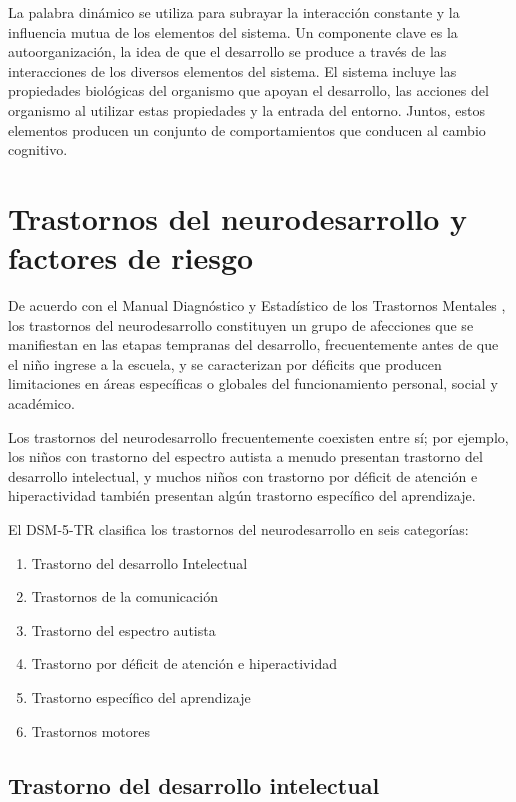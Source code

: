 \documentclass[11pt,letterpaper]{report}
\begin{document}
La palabra dinámico se utiliza para subrayar la interacción constante y la
influencia mutua de los elementos del sistema. Un componente clave es la
autoorganización, la idea de que el desarrollo se produce a través de las
interacciones de los diversos elementos del sistema. El sistema incluye las
propiedades biológicas del organismo que apoyan el desarrollo, las acciones del
organismo al utilizar estas propiedades y la entrada del entorno. Juntos,
estos elementos producen un conjunto de comportamientos que conducen al cambio
cognitivo. \cite{Gauvain2022}

\section{Trastornos del neurodesarrollo y factores de riesgo}
De acuerdo con el Manual Diagnóstico y Estadístico de los Trastornos Mentales
\cite{DSM5TR}, los trastornos del neurodesarrollo constituyen un grupo de 
afecciones que se manifiestan en las etapas tempranas del desarrollo, 
frecuentemente antes de que el niño ingrese a la escuela, y se caracterizan 
por déficits que producen limitaciones en áreas específicas o globales del
funcionamiento personal, social y académico.

Los trastornos del neurodesarrollo frecuentemente coexisten entre sí; por 
ejemplo, los niños con trastorno del espectro autista a menudo presentan 
trastorno del desarrollo intelectual, y muchos niños con trastorno por déficit
de atención e hiperactividad también presentan algún trastorno específico del
aprendizaje. \cite{DSM5TR}

El DSM-5-TR clasifica los trastornos del neurodesarrollo en seis categorías:
    \begin{enumerate}
        \item Trastorno del desarrollo Intelectual
        \item Trastornos de la comunicación
        \item Trastorno del espectro autista
        \item Trastorno por déficit de atención e hiperactividad
        \item Trastorno específico del aprendizaje
        \item Trastornos motores
    \end{enumerate}

\subsection{Trastorno del desarrollo intelectual}
\end{document}
